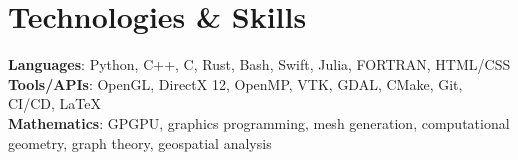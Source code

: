 \section{Technologies \& Skills}
 \begin{itemize}[leftmargin=0.15in, label={}]
    \small{\item{
     \textbf{Languages}{: Python, C++, C, Rust, Bash, Swift, Julia, FORTRAN, HTML/CSS} \\
     \textbf{Tools/APIs}{: OpenGL, DirectX 12, OpenMP, VTK, GDAL, CMake, Git, CI/CD, \LaTeX} \\
     \textbf{Mathematics}{: GPGPU, graphics programming, mesh generation, computational geometry, graph theory, geospatial analysis}
    }}
 \end{itemize}
